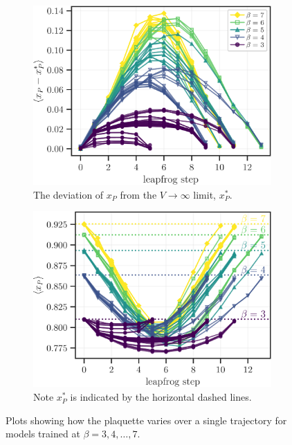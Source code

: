 \documentclass[a4paper,11pt]{article}
\begin{document}
\begin{figure}[htpb]
    \begin{subfigure}[b]{0.45\textwidth}
        \includegraphics[width=\linewidth]{assets/dplaqsf_vs_lf.pdf}
        \caption{\label{subfig:dplaqsf}The deviation of \(x_{P}\) from the
        \(V\rightarrow\infty\) limit, \(x_{P}^{\ast}\).}
    \end{subfigure}
    \hfill
    \begin{subfigure}[b]{0.45\textwidth}
        \includegraphics[width=\linewidth]{assets/plaqsf_vs_lf.pdf}
        \caption{\label{subfig:plaqsf}Note \(x^{\ast}_{P}\) is indicated by the
        horizontal dashed lines.}
    \end{subfigure}
    \caption{\label{fig:plaqsf}Plots showing how the plaquette varies
        over a single trajectory for models trained at \(\beta =
    3, 4, \ldots, 7\).}
\end{figure}
%
\end{document}
